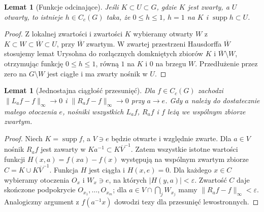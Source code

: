 \documentclass[11pt,a4paper]{article}
\numberwithin{equation}{section}
\theoremstyle{plain}
\newtheorem{lemat}[twierdzenie]{Lemat}
\theoremstyle{definition}
\theoremstyle{remark}
\newcommand{\supp}{\operatorname{supp}}
\begin{document}
\begin{lemat}[Funkcje odcinające]
Jeśli $K\subset U\subset G$, gdzie $K$ jest zwarty, a $U$ otwarty, to istnieje $h\in C_c(G)$ taka, że $0\le h\le1$, $h=1$ na $K$ i $\supp h\subset U$.
\end{lemat}
\begin{proof}
Z lokalnej zwartości i zwartości $K$ wybieramy otwarty $W$ z $K\subset W\subset\overline W\subset U$, przy $\overline W$ zwartym. W zwartej przestrzeni Hausdorffa $\overline W$ stosujemy lemat Urysohna do rozłącznych domkniętych zbiorów $K$ i $\overline W\setminus W$, otrzymując funkcję $0\le h\le1$, równą $1$ na $K$ i $0$ na brzegu $W$. Przedłużenie przez zero na $G\setminus W$ jest ciągłe i ma zwarty nośnik w $U$.
\end{proof}
\begin{lemat}[Jednostajna ciągłość przesunięć]
Dla $f\in C_c(G)$ zachodzi $\|L_af-f\|_\infty\to0$ i $\|R_af-f\|_\infty\to0$ przy $a\to e$. Gdy $a$ należy do dostatecznie małego otoczenia $e$, nośniki wszystkich $L_af$, $R_af$ i $f$ leżą we wspólnym zbiorze zwartym.
\end{lemat}
\begin{proof}
Niech $K=\supp f$, a $V\ni e$ będzie otwarte i względnie zwarte. Dla $a\in V$ nośnik $R_af$ jest zawarty w $K a^{-1}\subset K\overline V^{-1}$. Zatem wszystkie istotne wartości funkcji $H(x,a)=f(xa)-f(x)$ występują na wspólnym zwartym zbiorze $C=K\cup K\overline V^{-1}$. Funkcja $H$ jest ciągła i $H(x,e)=0$. Dla każdego $x\in C$ wybieramy otoczenia $O_x$ i $W_x\ni e$, na których $|H(y,a)|<\varepsilon$. Zwartość $C$ daje skończone podpokrycie $O_{x_1},\dots,O_{x_m}$; dla $a\in V\cap\bigcap_jW_{x_j}$ mamy $\|R_af-f\|_\infty<\varepsilon$. Analogiczny argument z $f(a^{-1}x)$ dowodzi tezy dla przesunięć lewostronnych.
\end{proof}
\end{document}
